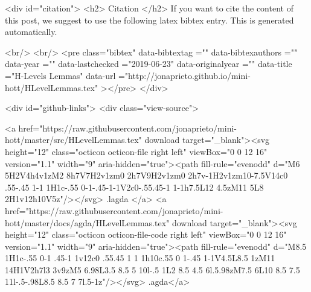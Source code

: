   
  <div id="citation">
  <h2> Citation </h2>
  If you want to cite the content of this post,
  we suggest to use the following latex bibtex entry.
  This is generated automatically.

  <br/>
  <br/>
  <pre class="bibtex"
       data-bibtextag =""
       data-bibtexauthors =""
       data-year =""
       data-lastchecked ="2019-06-23"
       data-originalyear =""
       data-title ="H-Levels Lemmas"
       data-url ="http://jonaprieto.github.io/mini-hott/HLevelLemmas.tex"
  ></pre>
  </div>
  

  <div id="github-links">
    <div class="view-source">
      
        <a href="https://raw.githubusercontent.com/jonaprieto/mini-hott/master/src/HLevelLemmas.tex" download target="_blank"><svg height="12" class="octicon octicon-file right left" viewBox="0 0 12 16" version="1.1" width="9" aria-hidden="true"><path fill-rule="evenodd" d="M6 5H2V4h4v1zM2 8h7V7H2v1zm0 2h7V9H2v1zm0 2h7v-1H2v1zm10-7.5V14c0 .55-.45 1-1 1H1c-.55 0-1-.45-1-1V2c0-.55.45-1 1-1h7.5L12 4.5zM11 5L8 2H1v12h10V5z"/></svg> .lagda </a>
        <a href="https://raw.githubusercontent.com/jonaprieto/mini-hott/master/docs/agda/HLevelLemmas.tex" download target="_blank"><svg height="12" class="octicon octicon-file-code right left" viewBox="0 0 12 16" version="1.1" width="9" aria-hidden="true"><path fill-rule="evenodd" d="M8.5 1H1c-.55 0-1 .45-1 1v12c0 .55.45 1 1 1h10c.55 0 1-.45 1-1V4.5L8.5 1zM11 14H1V2h7l3 3v9zM5 6.98L3.5 8.5 5 10l-.5 1L2 8.5 4.5 6l.5.98zM7.5 6L10 8.5 7.5 11l-.5-.98L8.5 8.5 7 7l.5-1z"/></svg> .agda</a>
      
